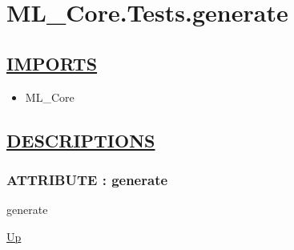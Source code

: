 \chapter*{ML\_Core.Tests.generate}
\hypertarget{ecldoc:toc:ML_Core.Tests.generate}{}

\section*{\underline{IMPORTS}}
\begin{itemize}
\item ML\_Core
\end{itemize}

\section*{\underline{DESCRIPTIONS}}
\subsection*{ATTRIBUTE : generate}
\hypertarget{ecldoc:ml_core.tests.generate}{}
\begin{minipage}[t]{\textwidth}
\begin{flushleft}
 generate 
\end{flushleft}
\end{minipage}
\hyperlink{ecldoc:toc:ML_Core/Tests}{Up}

\par
\par
